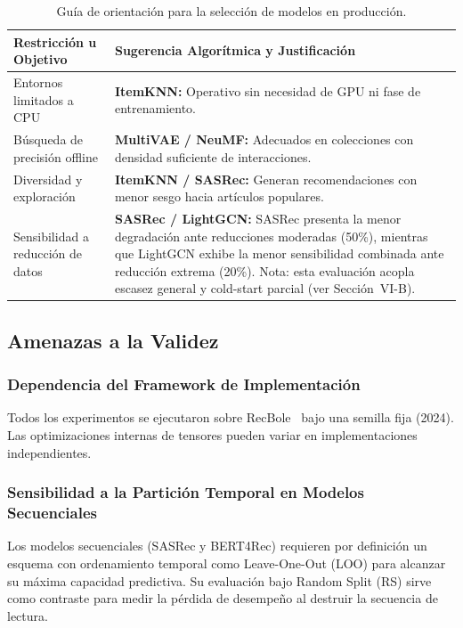 \documentclass[journal]{IEEEtran}
\begin{document}
\begin{table}[H]
\centering
\caption{Guía de orientación para la selección de modelos en producción.}
\label{tab:decision}
\footnotesize
\setlength{\tabcolsep}{3pt}
\begin{tabular}{p{2.3cm}p{5.5cm}}
\toprule
\textbf{Restricción u Objetivo} & \textbf{Sugerencia Algorítmica y Justificación} \\
\midrule
Entornos limitados a CPU & \textbf{ItemKNN:} Operativo sin necesidad de GPU ni fase de entrenamiento. \\
Búsqueda de precisión offline & \textbf{MultiVAE / NeuMF:} Adecuados en colecciones con densidad suficiente de interacciones. \\
Diversidad y exploración & \textbf{ItemKNN / SASRec:} Generan recomendaciones con menor sesgo hacia artículos populares. \\
Sensibilidad a reducción de datos & \textbf{SASRec / LightGCN:} SASRec presenta la menor degradación ante reducciones moderadas (50\%), mientras que LightGCN exhibe la menor sensibilidad combinada ante reducción extrema (20\%). Nota: esta evaluación acopla escasez general y cold-start parcial (ver Sección~VI-B). \\
\bottomrule
\end{tabular}
\end{table}

\subsection{Amenazas a la Validez}

\subsubsection{Dependencia del Framework de Implementación}
Todos los experimentos se ejecutaron sobre RecBole~\cite{zhao2021recbole} bajo una semilla fija (2024). Las optimizaciones internas de tensores pueden variar en implementaciones independientes.

\subsubsection{Sensibilidad a la Partición Temporal en Modelos Secuenciales}
Los modelos secuenciales (SASRec y BERT4Rec) requieren por definición un esquema con ordenamiento temporal como Leave-One-Out (LOO) para alcanzar su máxima capacidad predictiva. Su evaluación bajo Random Split (RS) sirve como contraste para medir la pérdida de desempeño al destruir la secuencia de lectura.
\end{document}
